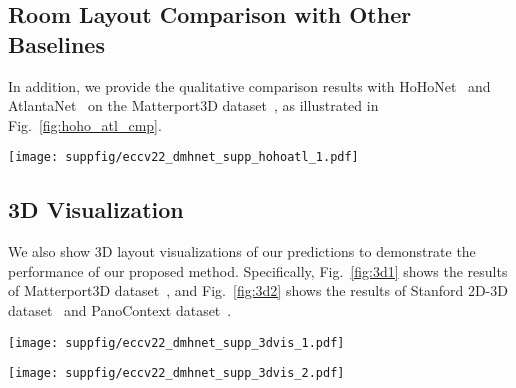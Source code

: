 \documentclass[runningheads]{llncs}
\begin{document}
\subsection{Room Layout Comparison with Other Baselines}
In addition, we provide the qualitative comparison results with HoHoNet~\cite{Sun_2021_HoHoNet} and AtlantaNet~\cite{pintore2020atlantanet} on the Matterport3D dataset~\cite{Matterport3D}, as illustrated in Fig.~\ref{fig:hoho_atl_cmp}.

\begin{figure*}[!h]
	\centering
	\vspace{-0.5cm}
	\texttt{[image: suppfig/eccv22\_dmhnet\_supp\_hohoatl\_1.pdf]}
	\vspace{-1ex}
	\caption{The qualitative results of Matterport3D~\cite{Matterport3D}. The green lines are ground truth layout while the pink, blue and red lines are estimated by HoHoNet~\cite{Sun_2021_HoHoNet}, AtlantaNet~\cite{pintore2020atlantanet} and our DMH-Net.}
\label{fig:hoho_atl_cmp} 
\end{figure*}

\subsection{3D Visualization}
We also show 3D layout visualizations of our predictions to demonstrate the performance of our proposed method. Specifically, Fig.~\ref{fig:3d1} shows the results of Matterport3D dataset~\cite{Matterport3D}, and Fig.~\ref{fig:3d2} shows the results of Stanford 2D-3D dataset~\cite{armeni2017joint} and PanoContext dataset~\cite{zhang2014panocontext}.

\begin{figure*}[!h]
	\centering
	\texttt{[image: suppfig/eccv22\_dmhnet\_supp\_3dvis\_1.pdf]}
	\vspace{-1ex}
	\caption{The 3D visualization results of Matterport3D dataset~\cite{Matterport3D}.}
\label{fig:3d1} 
\end{figure*}

\begin{figure*}[!h]
	\centering
	\texttt{[image: suppfig/eccv22\_dmhnet\_supp\_3dvis\_2.pdf]}
	\caption{The 3D visualization results of PanoContext dataset~\cite{zhang2014panocontext} and Stanford 2D-3D dataset~\cite{armeni2017joint}.}
\label{fig:3d2} 
\end{figure*} \clearpage


\end{document}
